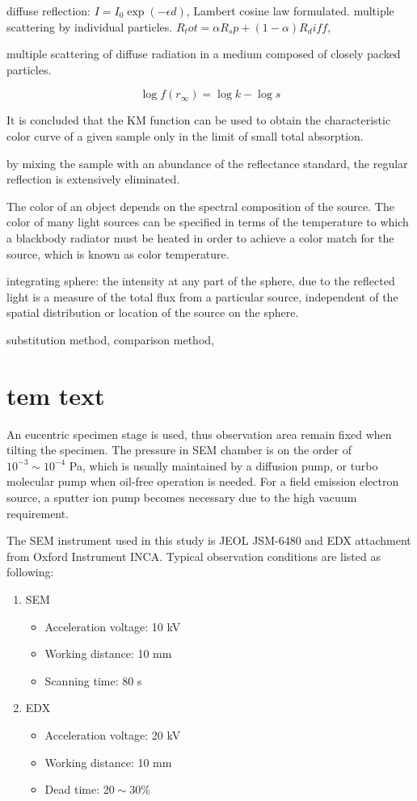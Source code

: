 diffuse reflection: $I = I_0 \exp(-\epsilon d)$, Lambert cosine law formulated. multiple scattering by individual particles. 
$R_tot = \alpha R_sp + (1- \alpha) R_diff $, 

multiple scattering of diffuse radiation in a medium composed of closely packed particles. 

\[
\log{f(r_\infty) = \log{k} - \log{s}}
\]

It is concluded that the KM function can be used to obtain the characteristic color curve of a given sample only in the limit of small total absorption. 

by mixing the sample with an abundance of the reflectance standard, the regular reflection is extensively eliminated. 

The color of an object depends on the spectral composition of the source. The color of many light sources can be specified in terms of the temperature to which a blackbody radiator must be heated in order to achieve a color match for the source, which is known as color temperature. 

integrating sphere: the intensity at any part of the sphere, due to the reflected light is a measure of the total flux from a particular source, independent of the spatial distribution or location of the source on the sphere. 

substitution method, comparison method, 

\fi
\section{tem text}


\iffalse
An eucentric specimen stage is used, thus observation area remain fixed when tilting the specimen. The pressure in SEM chamber is on the order of $10^{-3} \sim 10^{-4}$ Pa, which is usually maintained by a diffusion pump, or turbo molecular pump when oil-free operation is needed. For a field emission electron source, a sputter ion pump becomes necessary due to the high vacuum requirement. 

The SEM instrument used in this study is JEOL JSM-6480 and EDX attachment from Oxford Instrument INCA. Typical observation conditions are listed as following:

\begin{enumerate}
\item SEM
\begin{itemize}

\item Acceleration voltage: 10 kV
\item Working distance: 10 mm
\item Scanning time: 80 s
\end{itemize}
\item EDX
\begin{itemize}

\item Acceleration voltage: 20 kV
\item Working distance: 10 mm
\item Dead time: $20\sim30$\%
\end{itemize}
\end{enumerate}


